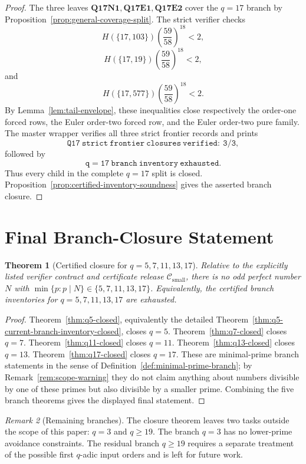 \documentclass[11pt]{article}
\newtheorem{theorem}{Theorem}[section]
\theoremstyle{definition}
\theoremstyle{remark}
\newtheorem{remark}[theorem]{Remark}
\newcommand{\Hfun}{H}
\newcommand{\Csmall}{\ensuremath{\mathcal C_{\mathrm{small}}}}
\begin{document}
\begin{proof}
The three leaves \(\mathbf{Q17N1},\mathbf{Q17E1},\mathbf{Q17E2}\) cover the
\(q=17\) branch by Proposition~\ref{prop:general-coverage-split}.  The strict
verifier checks
\[
  \Hfun(\{17,103\})\left(\frac{59}{58}\right)^{18}<2,
\]
\[
  \Hfun(\{17,19\})\left(\frac{59}{58}\right)^{18}<2,
\]
and
\[
  \Hfun(\{17,577\})\left(\frac{59}{58}\right)^{18}<2.
\]
By Lemma~\ref{lem:tail-envelope}, these inequalities close respectively the
order-one forced rows, the Euler order-two forced row, and the Euler order-two
pure family.  The master wrapper verifies all three strict frontier records and
prints
\[
  \mathtt{Q17\ strict\ frontier\ closures\ verified:\ 3/3},
\]
followed by
\[
  \mathtt{q=17\ branch\ inventory\ exhausted}.
\]
Thus every child in the complete \(q=17\) split is closed.
Proposition~\ref{prop:certified-inventory-soundness} gives the asserted
branch closure.
\end{proof}

\section{Final Branch-Closure Statement}
\label{sec:final}

\begin{theorem}[Certified closure for \(q=5,7,11,13,17\)]
\label{thm:final-closure}
Relative to the explicitly listed verifier contract and certificate release
\(\Csmall\), there is no odd perfect number \(N\) with
\(\min\{p:p\mid N\}\in\{5,7,11,13,17\}\).  Equivalently, the certified branch
inventories for \(q=5,7,11,13,17\) are exhausted.
\end{theorem}

\begin{proof}
Theorem~\ref{thm:q5-closed}, equivalently the detailed
Theorem~\ref{thm:q5-current-branch-inventory-closed}, closes \(q=5\).
Theorem~\ref{thm:q7-closed} closes \(q=7\).
Theorem~\ref{thm:q11-closed} closes \(q=11\).  Theorem~\ref{thm:q13-closed}
closes \(q=13\).  Theorem~\ref{thm:q17-closed} closes \(q=17\).
These are minimal-prime branch statements in the sense of
Definition~\ref{def:minimal-prime-branch}; by Remark~\ref{rem:scope-warning}
they do not claim anything about numbers divisible by one of these primes but
also divisible by a smaller prime.  Combining the five branch theorems gives
the displayed final statement.
\end{proof}

\begin{remark}[Remaining branches]
The closure theorem leaves two tasks outside the scope of this paper: \(q=3\)
and \(q\ge19\).
The branch \(q=3\) has no lower-prime avoidance constraints.  The residual
branch \(q\ge19\) requires a separate treatment of the possible first
\(q\)-adic input orders and is left for future work.
\end{remark}
\end{document}
